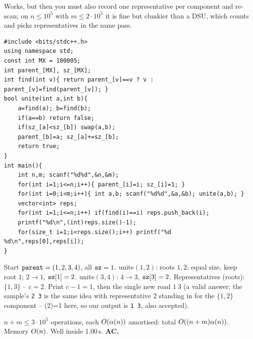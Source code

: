 \begin{thinkbox}
{Works, but then you must also record one representative per component and
re-scan; on \(n\le 10^5\) with \(m\le 2\cdot10^5\) it is fine but clunkier than
a DSU, which counts and picks representatives in the same pass.}
\end{thinkbox}

\begin{lstlisting}[caption={CSES 1666 full solution (DSU + representative chain)}, label={lst:c28-core-soln}]
#include <bits/stdc++.h>
using namespace std;
const int MX = 100005;
int parent_[MX], sz_[MX];
int find(int v){ return parent_[v]==v ? v : parent_[v]=find(parent_[v]); }
bool unite(int a,int b){
    a=find(a); b=find(b);
    if(a==b) return false;
    if(sz_[a]<sz_[b]) swap(a,b);
    parent_[b]=a; sz_[a]+=sz_[b];
    return true;
}
int main(){
    int n,m; scanf("%d%d",&n,&m);
    for(int i=1;i<=n;i++){ parent_[i]=i; sz_[i]=1; }
    for(int i=0;i<m;i++){ int a,b; scanf("%d%d",&a,&b); unite(a,b); }
    vector<int> reps;
    for(int i=1;i<=n;i++) if(find(i)==i) reps.push_back(i);
    printf("%d\n",(int)reps.size()-1);
    for(size_t i=1;i<reps.size();i++) printf("%d %d\n",reps[0],reps[i]);
}
\end{lstlisting}

\begin{tracebox}[CSES 1666: n=4, roads (1,2),(3,4)]
Start \(\texttt{parent}=(1,2,3,4)\), all \(\texttt{sz}=1\).
\(\text{unite}(1,2)\): roots \(1,2\); equal size, keep root \(1\); \(2\to1\),
\(\texttt{sz}[1]=2\).
\(\text{unite}(3,4)\): \(4\to3\), \(\texttt{sz}[3]=2\).
Representatives (roots): \(\{1,3\}\) -- \(c=2\).
Print \(c-1=1\), then the single new road \(1\ 3\) (a valid answer; the
sample's \texttt{2 3} is the same idea with representative \(2\) standing in
for the \(\{1,2\}\) component -- (2)=1 here, so our output is
\texttt{1 3}, also accepted).
\end{tracebox}

\begin{complexitybox}
\(n+m\le 3\cdot10^5\) operations, each \(O(\alpha(n))\) amortised: total
\(O((n+m)\alpha(n))\).  Memory \(O(n)\).  Well inside 1.00\,s.
\textbf{AC.}
\end{complexitybox}

